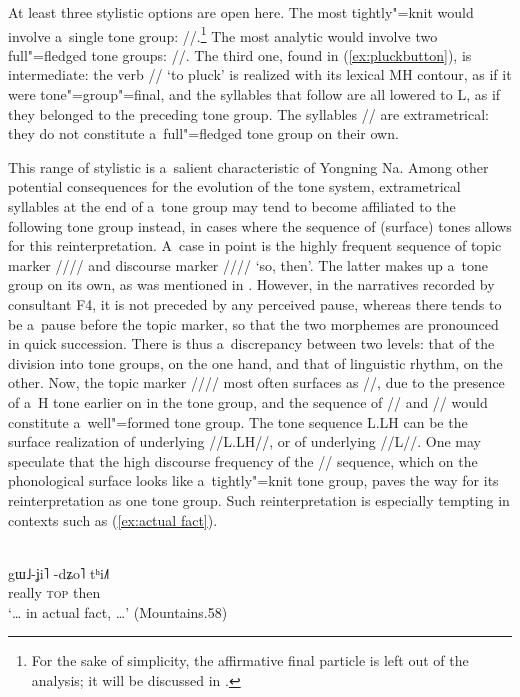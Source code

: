 At least three stylistic options are open here. The most tightly"=knit would involve a~single tone group:
//.\footnote{For the sake of simplicity, the {affirmative} final particle is left out of the analysis; it will be discussed in .} The most analytic would involve two full"=fledged tone groups: //. The third one, found in (\ref{ex:pluckbutton}), is intermediate: the verb // ‘to pluck’ is realized with its lexical MH
contour, as if it were tone"=group"=final, and the syllables that follow are all lowered to L, as if
they belonged to the preceding tone group. The syllables //  are extrametrical: they do not constitute a~full"=fledged tone group on their own.

This range of stylistic  is a~salient characteristic of Yongning Na.\Hack{\break} Among other potential
consequences for the evolution of the tone system, extrametrical syllables at the end of a~tone
group may tend to become affiliated to the following tone group instead, in cases where the sequence
of (surface) tones allows for this reinterpretation. A~case in point is the highly frequent sequence of topic marker //// and discourse marker //// ‘so, then’. The latter
makes up a~tone group on its own, as was mentioned in . However, in the narratives
recorded by consultant F4, it is not preceded by any perceived pause, whereas there tends to be a~pause
before the topic marker, so that the two morphemes are pronounced
in quick succession. There is thus a~discrepancy between two levels: that of the division into tone
groups, on the one hand, and that of linguistic rhythm, on the other. Now, the topic marker //// most often surfaces as //, due to the presence of a~H tone earlier on in the tone group, and the sequence of // and // would constitute a~well"=formed tone group. The tone sequence L.LH can be the surface realization of underlying //L.LH//, or of underlying //L//. One may speculate that the
high discourse frequency of the // sequence, which on the phonological surface looks like a~tightly"=knit tone group, paves the
way for its reinterpretation as one tone group. Such reinterpretation is especially tempting in contexts such as (\ref{ex:actual fact}).

\begin{exe}
	\ex
	\label{ex:actual fact}
	\\
	\gll gɯ˩-ʝi˥	-dʑo˥		tʰi˩˥\\
	really		\textsc{top}		then\\
	\glt ‘{\dots} in actual fact, {\dots}’ (Mountains.58)
\end{exe}

